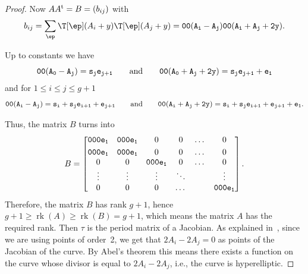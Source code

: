 \begin{proof}
 Now $A A^{\rm t}= B=(b_{ij}) $ with
\[
b_{ij}=\sum_{\ep} \T[\ep] (A_i+y)\T[\ep] (A_j+y)=\tt {0}{0}(A_i-A_j)\tt {0}{0}(A_i+A_j+2y).
\]

Up to constants we have
\[
\tt {0}{0}(A_0-A_j)=\tt{s_j}{e_{j+1}} \qquad {\rm and}\qquad \tt {0}{0}(A_0+A_j+2y)=\tt{s_j}{e_{j+1}+e_1}
\]
and for $1\leq i\leq j\leq g+1$
\[
\tt {0}{0}(A_i-A_j)=\tt{s_i+s_j}{e_{i+1}+e_{j+1}} \qquad {\rm and}\qquad \tt {0}{0}(A_i+A_j+2y)=\tt{s_i+s_j}{e_{i+1}+e_{j+1}+e_1}.
\]

Thus, the matrix $B$ turns into
\[ B=
 \begin{bmatrix} \tt {0}{0} \tt {0}{e_1} & \tt {0}{0} \tt {0}{e_1}&0&0&\dots&0\vspace{1mm}\\
\tt {0}{0} \tt {0}{e_1} & \tt {0}{0} \tt {0}{e_1}&0&0&\dots&0\\
0& 0&\tt {0}{0} \tt {0}{e_1}&0&\dots&0\\
\vdots & \vdots &\vdots &\ddots& &\vdots\\
0& 0&0&\dots& &\tt {0}{0} \tt {0}{e_1}
 \end{bmatrix}.
\]
Therefore, the matrix $B$ has rank $g+1$, hence $g+1\geq \operatorname{rk}(A)\geq \operatorname{rk}(B)=g+1$, which means the matrix $A$ has the required rank. Then $\tau$ is the period matrix of a Jacobian. As explained in~\cite{Gr}, since we are using points of order~2, we get that $2A_i- 2A_j=0$ as points of the Jacobian of the curve. By Abel's theorem this means there exists a function on the curve whose divisor is equal to $2A_i -2A_j$, i.e., the curve is hyperelliptic.
\end{proof}
